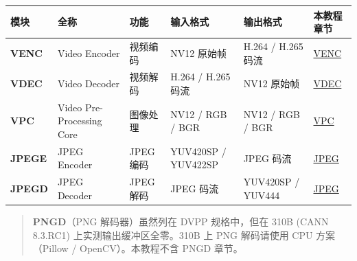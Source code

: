 \begin{longtable}[]{@{}
  >{\raggedright\arraybackslash}p{}
  >{\raggedright\arraybackslash}p{}
  >{\raggedright\arraybackslash}p{}
  >{\raggedright\arraybackslash}p{}
  >{\raggedright\arraybackslash}p{}
  >{\raggedright\arraybackslash}p{}@{}}
\toprule\noalign{}
\begin{minipage}[b]{\linewidth}\raggedright
模块
\end{minipage} & \begin{minipage}[b]{\linewidth}\raggedright
全称
\end{minipage} & \begin{minipage}[b]{\linewidth}\raggedright
功能
\end{minipage} & \begin{minipage}[b]{\linewidth}\raggedright
输入格式
\end{minipage} & \begin{minipage}[b]{\linewidth}\raggedright
输出格式
\end{minipage} & \begin{minipage}[b]{\linewidth}\raggedright
本教程章节
\end{minipage} \\
\midrule\noalign{}
\endhead
\bottomrule\noalign{}
\endlastfoot
\textbf{VENC} & Video Encoder & 视频编码 & NV12 原始帧 & H.264 / H.265
码流 & \hyperref[venc]{VENC} \\
\textbf{VDEC} & Video Decoder & 视频解码 & H.264 / H.265 码流 & NV12
原始帧 & \hyperref[vdec]{VDEC} \\
\textbf{VPC} & Video Pre-Processing Core & 图像处理 & NV12 / RGB / BGR &
NV12 / RGB / BGR & \hyperref[vpc]{VPC} \\
\textbf{JPEGE} & JPEG Encoder & JPEG 编码 & YUV420SP / YUV422SP & JPEG
码流 & \hyperref[jpeg]{JPEG} \\
\textbf{JPEGD} & JPEG Decoder & JPEG 解码 & JPEG 码流 & YUV420SP /
YUV444 & \hyperref[jpeg]{JPEG} \\
\end{longtable}

\begin{quote}
\textbf{PNGD}（PNG 解码器）虽然列在 DVPP 规格中，但在 310B (CANN
8.3.RC1) 上实测输出缓冲区全零。310B 上 PNG 解码请使用 CPU 方案（Pillow /
OpenCV）。本教程不含 PNGD 章节。
\end{quote}

